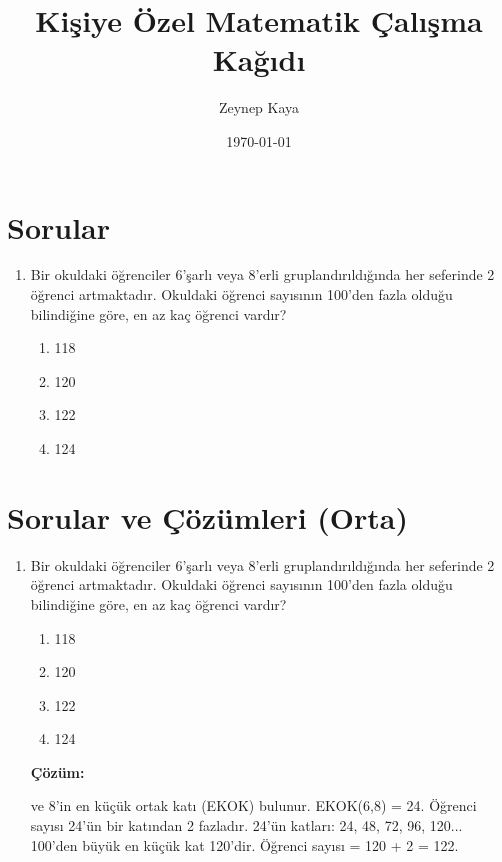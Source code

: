 \documentclass[12pt,a4paper]{article}
\title{\textbf{Kişiye Özel Matematik Çalışma Kağıdı}}
\author{Zeynep Kaya}
\date{\today}
\begin{document}
\maketitle

\section*{Sorular}
\begin{enumerate}
  \item Bir okuldaki öğrenciler 6'şarlı veya 8'erli gruplandırıldığında her seferinde 2 öğrenci artmaktadır. Okuldaki öğrenci sayısının 100'den fazla olduğu bilindiğine göre, en az kaç öğrenci vardır?
  \begin{enumerate}
    \item 118
    \item 120
    \item 122
    \item 124
  \end{enumerate}
  \vspace{1cm}
\end{enumerate}
\newpage
\section*{Sorular ve Çözümleri (Orta)}
\begin{enumerate}
  \item Bir okuldaki öğrenciler 6'şarlı veya 8'erli gruplandırıldığında her seferinde 2 öğrenci artmaktadır. Okuldaki öğrenci sayısının 100'den fazla olduğu bilindiğine göre, en az kaç öğrenci vardır?
  \begin{enumerate}
    \item 118
    \item 120
    \item 122
    \item 124
  \end{enumerate}
  \vspace{5pt}
  \par\noindent\textbf{Çözüm:}
  \par{} ve 8'in en küçük ortak katı (EKOK) bulunur. EKOK(6,8) = 24. Öğrenci sayısı 24'ün bir katından 2 fazladır. 24'ün katları: 24, 48, 72, 96, 120... 100'den büyük en küçük kat 120'dir. Öğrenci sayısı = 120 + 2 = 122.\vspace{1cm}

\end{enumerate}
\end{document}
